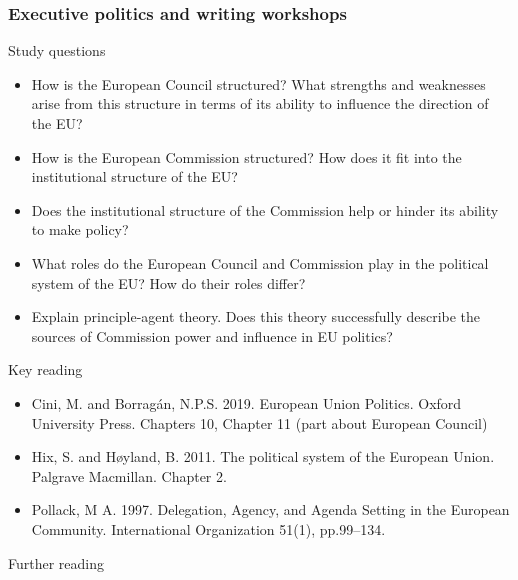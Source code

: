 \subsubsection*{Executive politics and writing workshops}

Study questions

\begin{itemize}
	\item How is the European Council structured? What strengths and weaknesses arise from this structure in terms of its ability to influence the direction of the EU?
	\item How is the European Commission structured? How does it fit into the institutional structure of the EU? 
	\item Does the institutional structure of the Commission help or hinder its ability to make policy?
	\item What roles do the European Council and Commission play in the political system of the EU? How do their roles differ?
	\item Explain principle-agent theory. Does this theory successfully describe the sources of Commission power and influence in EU politics?
\end{itemize}

\noindent Key reading

\begin{itemize}
	\item Cini, M. and Borragán, N.P.S. 2019. European Union Politics. Oxford University Press. Chapters 10, Chapter 11 (part about European Council)
	\item Hix, S. and H\o yland, B. 2011. The political system of the European Union. Palgrave Macmillan. Chapter 2. 
	\item Pollack, M A. 1997. Delegation, Agency, and Agenda Setting in the European Community. International Organization 51(1), pp.99–134.
\end{itemize}

\noindent Further reading

